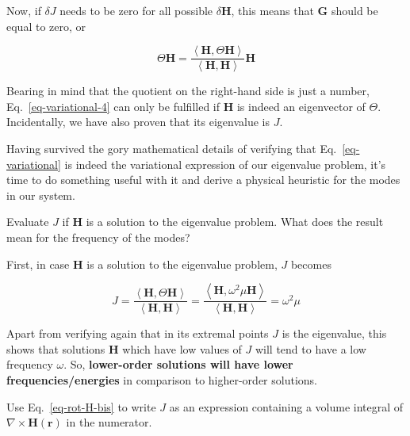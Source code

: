 Now, if $\delta J$ needs to be zero for all possible ${\delta \mathbf H}$, this means that ${\mathbf G}$ should be equal to zero, or

\begin{equation}
\Theta {\mathbf H} = \frac{\left\langle {\mathbf H} , \Theta {\mathbf H}\right\rangle}{\left\langle {\mathbf H} , {\mathbf H}\right\rangle} {\mathbf H} \label{eq-variational-4}
\end{equation} 

Bearing in mind that the quotient on the right-hand side is just a number, Eq.~\ref{eq-variational-4} can only be fulfilled if ${\mathbf H}$ is indeed an eigenvector of $\Theta$. Incidentally, we have also proven that its eigenvalue is $J$.


\pagebreak
{}

Having survived the gory mathematical details of verifying that Eq.~\ref{eq-variational} is indeed the variational expression of our eigenvalue problem, it's time to do something useful with it and derive a physical heuristic for the modes in our system.

\begin{cue}
Evaluate $J$ if ${\mathbf H}$ is a solution to the eigenvalue problem. What does the result mean for the frequency of the modes?  
\end{cue}
  
First, in case ${\mathbf H}$ is a solution to the eigenvalue problem, $J$ becomes

\begin{equation}
J =  \frac{\left\langle {\mathbf H} , \Theta {\mathbf H}\right\rangle}{\left\langle {\mathbf H} , {\mathbf H}\right\rangle} = \frac{\left\langle {\mathbf H} , \omega^2 \mu {\mathbf H}\right\rangle}{\left\langle {\mathbf H} , {\mathbf H}\right\rangle} = \omega^2 \mu
\end{equation}

Apart from verifying again that in its extremal points $J$ is the eigenvalue, this shows that solutions ${\mathbf H}$ which have low values of $J$ will tend to have a low frequency $\omega$. So, \textbf{lower-order solutions will have lower frequencies/energies} in comparison to higher-order solutions.

\begin{cue}
Use Eq.~\ref{eq-rot-H-bis} to write $J$ as an expression containing a volume integral of $ \nabla \times {\mathbf H({\mathbf r})}$ in the numerator.   
\end{cue}

